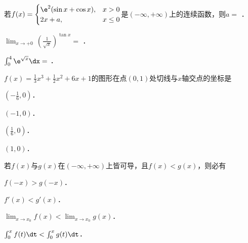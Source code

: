 \documentclass[plain,noanswer,medmath]{../../template/jnuexam}
\begin{document}






\begin{problem}
若$f(x)=\begin{cases}
  \e^2(\sin x+\cos x), & x>0 \\
                 2x+a, & x\le 0
\end{cases}$是$(-\infty,+\infty)$上的连续函数，则$a=$ \fillin{}．
\end{problem}






\begin{problem}
$\lim_{x\to +0}\,\left(\frac{1}{\sqrt{x}} \right)^{\tan x}=$ \fillin{}．
\end{problem}


\begin{problem}
$\int_0^4\e^{\sqrt{x}} \dx=$ \fillin{}．
\end{problem}




\begin{problem}
$f(x)=\frac{1}{3}x^3+\frac{1}{2}x^2+6x+1$的图形在点$\left(0,1 \right)$处切线与$x$轴交点的坐标是\pickout{}
\begin{abcd}
\item $\left(-\frac{1}{6},0\right)$．         
\item $\left(-1,0\right)$．      
\item $\left(\frac{1}{6},0\right)$．      
\item $\left(1,0\right)$．
\end{abcd}
\end{problem}


\begin{problem}
若$f(x)$与$g(x)$在$(-\infty,+\infty)$上皆可导，且$f(x)<g(x)$，则必有\pickout{}
\begin{abcd}
\item $f(-x)>g(-x)$．
\item $f'(x)<g'(x)$．
\item $\lim_{x\to x_0}f(x)<\lim_{x\to x_0}g(x)$．
\item $\int_0^x f(t)\dt<\int_0^x g(t)\dt$．
\end{abcd}
\end{problem}
\end{document}
